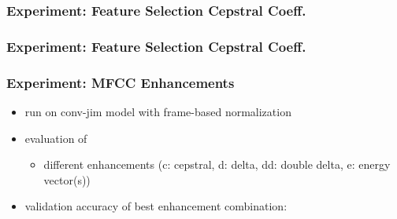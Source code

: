 \begin{frame}
  \frametitle{Experiment: Feature Selection Cepstral Coeff.}
  \begin{figure}[!ht]
    \centering
  \end{figure}
\end{frame}

\begin{frame}
  \frametitle{Experiment: Feature Selection Cepstral Coeff.}
  \centering \vfill
  
\end{frame}

\begin{frame}
  \frametitle{Experiment: MFCC Enhancements}
  \begin{itemize}
    \item run on conv-jim model with frame-based normalization
    \item evaluation of
    \begin{itemize}
     \item different enhancements (c: cepstral, d: delta, dd: double delta, e: energy vector(s))
    \end{itemize}
    \item validation accuracy of best enhancement combination:
  \end{itemize}
  \vspace{-0.5cm}
  \begin{figure}[!ht]
    \centering
  \end{figure}
\end{frame}

